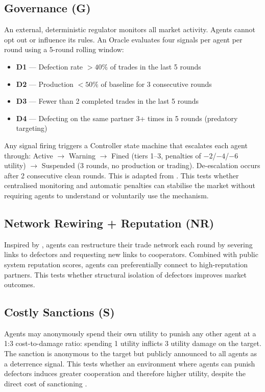 \documentclass{article}
\begin{document}
\subsection{Governance (G)}

An external, deterministic regulator monitors all market activity. Agents cannot opt out or influence its rules. An Oracle evaluates four signals per agent per round using a 5-round rolling window:

\begin{itemize}
  \item \textbf{D1} --- Defection rate $>40\%$ of trades in the last 5 rounds
  \item \textbf{D2} --- Production $<50\%$ of baseline for 3 consecutive rounds
  \item \textbf{D3} --- Fewer than 2 completed trades in the last 5 rounds
  \item \textbf{D4} --- Defecting on the same partner 3+ times in 5 rounds (predatory targeting)
\end{itemize}

Any signal firing triggers a Controller state machine that escalates each agent through: Active $\to$ Warning $\to$ Fined (tiers 1--3, penalties of $-2$/$-4$/$-6$ utility) $\to$ Suspended (3 rounds, no production or trading). De-escalation occurs after 2 consecutive clean rounds. This is adapted from \citet{institutional2025}. This tests whether centralised monitoring and automatic penalties can stabilise the market without requiring agents to understand or voluntarily use the mechanism.

\subsection{Network Rewiring + Reputation (NR)}

Inspired by \citet{repunet}, agents can restructure their trade network each round by severing links to defectors and requesting new links to cooperators. Combined with public system reputation scores, agents can preferentially connect to high-reputation partners. This tests whether structural isolation of defectors improves market outcomes.

\subsection{Costly Sanctions (S)}

Agents may anonymously spend their own utility to punish any other agent at a 1:3 cost-to-damage ratio: spending 1 utility inflicts 3 utility damage on the target. The sanction is anonymous to the target but publicly announced to all agents as a deterrence signal. This tests whether an environment where agents can punish defectors induces greater cooperation and therefore higher utility, despite the direct cost of sanctioning \citep{piedrahita2025}.
\end{document}
